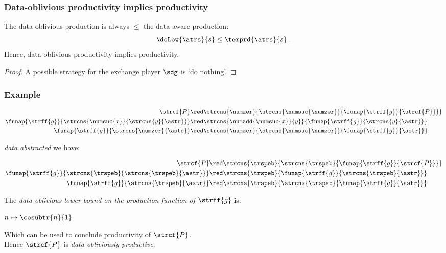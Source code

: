 \documentclass[10pt]{beamer}
\begin{document}
\begin{frame}%
  \frametitle{Data-oblivious productivity implies productivity}

\begin{proposition}
  The data oblivious production is always $\le$ the data aware production:
  \begin{equation*}
    \doLow{\atrs}{s} \le \terprd{\atrs}{s} \; .
  \end{equation*}
  Hence, data-oblivious productivity implies productivity.
\end{proposition}

\begin{proof}
  A possible strategy for the exchange player $\sdg$ is `do nothing'.
\end{proof}

\end{frame}%

\begin{frame}%
  \frametitle{Example}

\begin{example}
  \vspace{-3.0ex}
\begin{align*}
  \strcf{P} &\red \strcns{\numzer}{\strcns{\numsuc{\numzer}}{\funap{\strff{g}}{\strcf{P}}}}\\
  \funap{\strff{g}}{\strcns{\numsuc{x}}{\strcns{y}{\astr}}}
  &\red \strcns{\numadd{\numsuc{x}}{y}}{\funap{\strff{g}}{\strcns{y}{\astr}}}\\
  \funap{\strff{g}}{\strcns{\numzer}{\astr}}
  &\red \strcns{\numzer}{\strcns{\numsuc{\numzer}}{\funap{\strff{g}}{\astr}}}
\end{align*}
  \vspace{-3.0ex}

\emph{data %
           abstracted} we have:
  \vspace{-3.5ex}

\begin{align*}
  \strcf{P} &\red \strcns{\trspeb}{\strcns{\trspeb}{\funap{\strff{g}}{\strcf{P}}}}\\
  \funap{\strff{g}}{\strcns{\trspeb}{\strcns{\trspeb}{\astr}}}
  &\red \strcns{\trspeb}{\funap{\strff{g}}{\strcns{\trspeb}{\astr}}}\\
  \funap{\strff{g}}{\strcns{\trspeb}{\astr}}
  &\red \strcns{\trspeb}{\strcns{\trspeb}{\funap{\strff{g}}{\astr}}}
\end{align*}
  \vspace{-3.0ex}
\end{example}
%
The \emph{data oblivious lower bound on the production function of $\strff{g}$} is:
\centerline{$n \mapsto \cosubtr{n}{1}$}
Which can be used to conclude productivity of $\strcf{P}$.\\
Hence $\strcf{P}$ is \emph{data-obliviously productive}.
\end{frame}%
\end{document}
